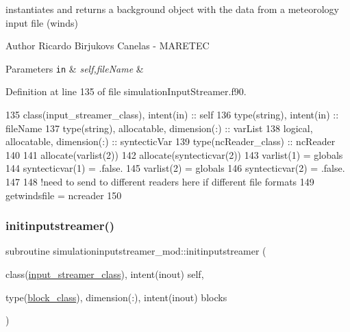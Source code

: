 instantiates and returns a background object with the data from a meteorology input file (winds) 

\begin{DoxyAuthor}{Author}
Ricardo Birjukovs Canelas -\/ M\+A\+R\+E\+T\+EC 
\end{DoxyAuthor}

\begin{DoxyParams}[1]{Parameters}
\mbox{\tt in}  & {\em self,file\+Name} & \\
\hline
\end{DoxyParams}


Definition at line 135 of file simulation\+Input\+Streamer.\+f90.


\begin{DoxyCode}
135     \textcolor{keywordtype}{class}(input\_streamer\_class), \textcolor{keywordtype}{intent(in)} :: self
136     \textcolor{keywordtype}{type}(string), \textcolor{keywordtype}{intent(in)} :: fileName
137     \textcolor{keywordtype}{type}(string), \textcolor{keywordtype}{allocatable}, \textcolor{keywordtype}{dimension(:)} :: varList
138     \textcolor{keywordtype}{logical}, \textcolor{keywordtype}{allocatable}, \textcolor{keywordtype}{dimension(:)} :: syntecticVar
139     \textcolor{keywordtype}{type}(ncReader\_class) :: ncReader
140 
141     \textcolor{keyword}{allocate}(varlist(2))
142     \textcolor{keyword}{allocate}(syntecticvar(2))
143     varlist(1) = globals%
144     syntecticvar(1) = .false.
145     varlist(2) = globals%
146     syntecticvar(2) = .false.
147 
148     \textcolor{comment}{!need to send to different readers here if different file formats}
149     getwindsfile = ncreader%
150 
\end{DoxyCode}
\mbox{\label{namespacesimulationinputstreamer__mod_a9f81731f839f49c42a281c1334f528da}} 
\subsubsection{\texorpdfstring{initinputstreamer()}{initinputstreamer()}}
{\footnotesize\ttfamily subroutine simulationinputstreamer\+\_\+mod\+::initinputstreamer (\begin{DoxyParamCaption}\item[{class(\mbox{\hyperlink{structsimulationinputstreamer__mod_1_1input__streamer__class}{input\+\_\+streamer\+\_\+class}}), intent(inout)}]{self,  }\item[{type(\mbox{\hyperlink{structblocks__mod_1_1block__class}{block\+\_\+class}}), dimension(\+:), intent(inout)}]{blocks }\end{DoxyParamCaption})\hspace{0.3cm}{\ttfamily [private]}}



